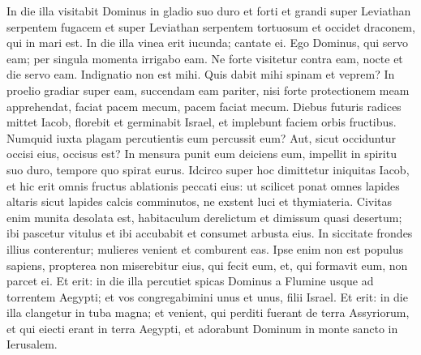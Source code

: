 \begin{biblechapter}  
\verse In die illa visitabit Dominus in gladio suo duro et forti et grandi super Leviathan serpentem fugacem et super Leviathan serpentem tortuosum et occidet draconem, qui in mari est. 
\verse In die illa vinea erit iucunda; cantate ei. 
\verse Ego Dominus, qui servo eam; per singula momenta irrigabo eam. Ne forte visitetur contra eam, nocte et die servo eam. 
\verse Indignatio non est mihi. Quis dabit mihi spinam et veprem? In proelio gradiar super eam, succendam eam pariter, 
\verse nisi forte protectionem meam apprehendat, faciat pacem mecum, pacem faciat mecum. 
\verse Diebus futuris radices mittet Iacob, florebit et germinabit Israel, et implebunt faciem orbis fructibus. 
\verse Numquid iuxta plagam percutientis eum percussit eum? Aut, sicut occiduntur occisi eius, occisus est? 
\verse In mensura punit eum deiciens eum, impellit in spiritu suo duro, tempore quo spirat eurus. 
\verse Idcirco super hoc dimittetur iniquitas Iacob, et hic erit omnis fructus ablationis peccati eius: ut scilicet ponat omnes lapides altaris sicut lapides calcis comminutos, ne exstent luci et thymiateria. 
\verse Civitas enim munita desolata est, habitaculum derelictum et dimissum quasi desertum; ibi pascetur vitulus et ibi accubabit et consumet arbusta eius. 
\verse In siccitate frondes illius conterentur; mulieres venient et comburent eas. Ipse enim non est populus sapiens, propterea non miserebitur eius, qui fecit eum, et, qui formavit eum, non parcet ei. 
\verse Et erit: in die illa percutiet spicas Dominus a Flumine usque ad torrentem Aegypti; et vos congregabimini unus et unus, filii Israel. 
\verse Et erit: in die illa clangetur in tuba magna; et venient, qui perditi fuerant de terra Assyriorum, et qui eiecti erant in terra Aegypti, et adorabunt Dominum in monte sancto in Ierusalem. 
\end{biblechapter}

